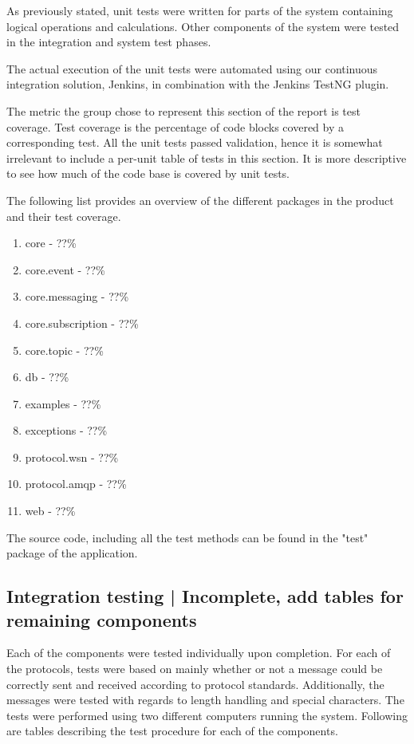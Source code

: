 As previously stated, unit tests were written for parts of the system containing logical operations and calculations. Other components of the system were tested in the integration and system test phases.

The actual execution of the unit tests were automated using our continuous integration solution, Jenkins, in combination with the Jenkins TestNG plugin.

The metric the group chose to represent this section of the report is test coverage. Test coverage is the percentage of code blocks covered by a corresponding test. All the unit tests passed validation, hence it is somewhat irrelevant to include a per-unit table of tests in this section. It is more descriptive to see how much of the code base is covered by unit tests.

The following list provides an overview of the different packages in the product and their test coverage.

\begin{enumerate}
\item core - ??\%
\item core.event - ??\%
\item core.messaging - ??\%
\item core.subscription - ??\%
\item core.topic - ??\%
\item db - ??\%
\item examples - ??\%
\item exceptions - ??\%
\item protocol.wsn - ??\%
\item protocol.amqp - ??\%
\item web - ??\%
\end{enumerate}

The source code, including all the test methods can be found in the "test" package of the application.

\subsection{Integration testing | Incomplete, add tables for remaining components}

Each of the components were tested individually upon completion. For each of the protocols, tests were based on mainly whether or not a message could be correctly sent and received according to protocol standards. Additionally, the messages were tested with regards to length handling and special characters. The tests were performed using two different computers running the system. Following are tables describing the test procedure for each of the components.

